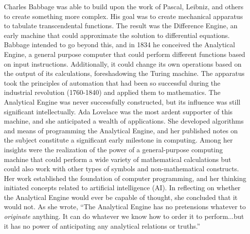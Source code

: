 \documentclass[twocolumn]{article}
\begin{document}
Charles Babbage was able to build upon the work of Pascal, Leibniz, and others to create something more complex. His goal was to create mechanical apparatus to tabulate transcendental functions. The result was the Difference Engine, an early machine that could approximate the solution to differential equations. Babbage intended to go beyond this, and in 1834 he conceived the Analytical Engine, a general purpose computer that could perform different functions based on input instructions. Additionally, it could change its own operations based on the output of its calculations, foreshadowing the Turing machine. The apparatus took the principles of automation that had been so successful during the industrial revolution (1760-1840) and applied them to mathematics. The Analytical Engine was never successfully constructed, but its influence was still significant intellectually. Ada Lovelace was the most ardent supporter of this machine, and she anticipated a wealth of applications. She developed algorithms and means of programming the Analytical Engine, and her published notes on the subject constitute a significant early milestone in computing. Among her insights were the realization of the power of a general-purpose computing machine that could perform a wide variety of mathematical calculations but could also work with other types of symbols and non-mathematical constructs. Her work established the foundation of computer programming, and her thinking initiated concepts related to artificial intelligence (AI). In reflecting on whether the Analytical Engine would ever be capable of thought, she concluded that it would not. As she wrote, ``The Analytical Engine has no pretensions whatever to \textit{originate} anything. It can do whatever we know how to order it to perform...but it has no power of anticipating any analytical relations or truths.'' \cite{is2014}   

\end{document}
